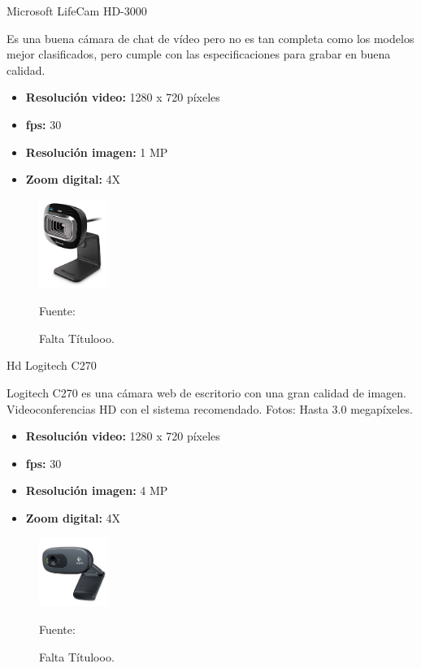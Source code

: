 \begin{enumerate}
{\bf\item[1. ] Microsoft LifeCam HD-3000} \vskip 0.1cm
Es una buena cámara de chat de vídeo pero no es tan completa como los modelos mejor clasificados, pero cumple con las especificaciones para grabar en buena calidad.
\begin{itemize}
\item[•] {\bf Resolución video:}
1280 x 720 píxeles
\item[•] {\bf fps:}
30
\item[•] {\bf Resolución imagen:}
1 MP
\item[•] {\bf Zoom digital:}
4X
\end{itemize}

\begin{figure}[ht]
\begin{center}
\includegraphics[width=0.2\textwidth]{Imagen9}
\end{center}
\begin{center}
\vskip -0.5cm
\caption{\small{Falta Títulooo.}}
{\small{Fuente: \cite{FALTA}}}
\end{center}
\end{figure}

{\bf\item[2. ] Hd Logitech C270} \vskip 0.1cm
Logitech C270 es una cámara web de escritorio con una gran calidad de imagen. Videoconferencias HD con el sistema recomendado. Fotos: Hasta 3.0 megapíxeles.
\begin{itemize}
\item[•] {\bf Resolución video:}
1280 x 720 píxeles
\item[•] {\bf fps:}
30
\item[•] {\bf Resolución imagen:}
4 MP
\item[•] {\bf Zoom digital:}
4X
\end{itemize}

\begin{figure}[ht]
\begin{center}
\includegraphics[width=0.2\textwidth]{Imagen10}
\end{center}
\begin{center}
\vskip -0.5cm
\caption{\small{Falta Títulooo.}}
{\small{Fuente: \cite{FALTA}}}
\end{center}
\end{figure}


\end{enumerate}
